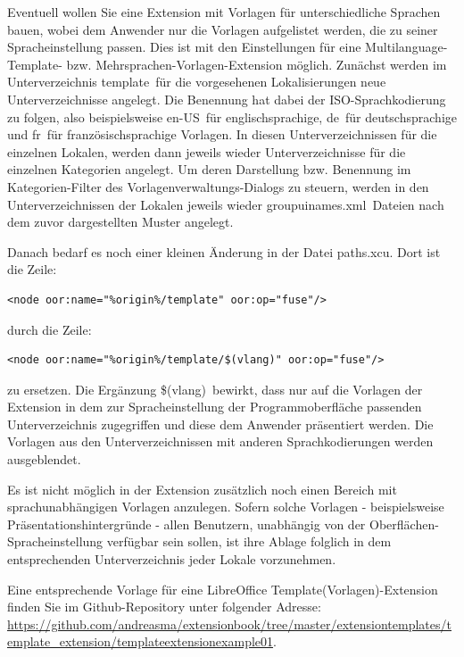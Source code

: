 \documentclass[a4paper,10pt,pagesize,titlepage]{scrbook}
\begin{document}
Eventuell wollen Sie eine Extension mit Vorlagen für unterschiedliche Sprachen bauen, wobei dem Anwender nur die Vorlagen aufgelistet werden, die zu seiner Spracheinstellung passen. Dies ist mit den Einstellungen für eine Multilanguage-Template- bzw. Mehrsprachen-Vorlagen-Extension möglich. Zunächst werden im Unterverzeichnis \glqq template\grqq~für die vorgesehenen Lokalisierungen neue Unterverzeichnisse angelegt. Die Benennung hat dabei der ISO-Sprachkodierung zu folgen, also  beispielsweise \glqq en-US\grqq~für englischsprachige, \glqq de\grqq~für deutschsprachige und \glqq fr\grqq~für französischsprachige Vorlagen. In diesen Unterverzeichnissen für die einzelnen Lokalen, werden dann jeweils wieder Unterverzeichnisse für die einzelnen Kategorien angelegt. Um deren Darstellung bzw. Benennung im Kategorien-Filter des Vorlagenverwaltungs-Dialogs zu steuern, werden in den Unterverzeichnissen der Lokalen jeweils wieder \glqq groupuinames.xml\grqq~Dateien nach dem zuvor dargestellten Muster angelegt.

Danach bedarf es noch einer kleinen Änderung in der Datei \glqq paths.xcu\grqq. Dort ist die Zeile:
\begin{lstlisting}
<node oor:name="%origin%/template" oor:op="fuse"/>
\end{lstlisting}

durch die Zeile:
\begin{lstlisting}
<node oor:name="%origin%/template/$(vlang)" oor:op="fuse"/>
\end{lstlisting}

zu ersetzen. Die Ergänzung \glqq \$(vlang)\grqq~bewirkt, dass nur auf die Vorlagen der Extension in dem zur Spracheinstellung der Programmoberfläche passenden Unterverzeichnis zugegriffen und diese dem Anwender präsentiert werden. Die Vorlagen aus den Unterverzeichnissen mit anderen Sprachkodierungen werden ausgeblendet.

Es ist nicht möglich in der Extension zusätzlich noch einen Bereich mit sprachunabhängigen Vorlagen anzulegen. Sofern solche Vorlagen - beispielsweise Präsentationshintergründe - allen Benutzern, unabhängig von der Oberflächen-Spracheinstellung verfügbar sein sollen, ist ihre Ablage folglich in dem entsprechenden Unterverzeichnis jeder Lokale vorzunehmen.

Eine entsprechende Vorlage für eine LibreOffice Template(Vorlagen)-Extension finden Sie im Github-Repository unter folgender Adresse:
\url{https://github.com/andreasma/extensionbook/tree/master/extensiontemplates/template_extension/templateextensionexample01}.
\end{document}

